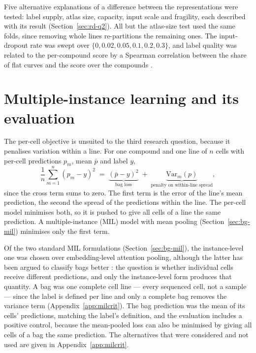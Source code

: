 Five alternative explanations of a difference between the representations were tested: label supply,
atlas size, capacity, input scale and fragility, each described with its result
(Section~\ref{sec:rd-q2}). All but the atlas-size test used the same folds, since removing whole lines
re-partitions the remaining ones. The input-dropout rate was swept over
$\{0, 0.02, 0.05, 0.1, 0.2, 0.3\}$, and label quality was related to the per-compound score by a
Spearman correlation between the share of flat curves and the score over the \NPanel{} compounds
\cite{bayer2023curvecurator}.

\section{Multiple-instance learning and its evaluation}
\label{sec:mil}

The per-cell objective is unsuited to the third research question, because it penalises variation
within a line. For one compound and one line of $n$ cells with per-cell predictions $p_m$, mean $\bar p$ and label $y$,
\begin{equation}
  \frac{1}{n}\sum_{m=1}^{n}\left(p_m - y\right)^2
  \;=\; \underbrace{\left(\bar{p} - y\right)^2}_{\text{bag loss}}
  \;+\; \underbrace{\mathrm{Var}_m(p)}_{\text{penalty on within-line spread}},
  \label{eq:mil-decomposition}
\end{equation}
since the cross term sums to zero. The first term is the error of the line's mean prediction, the second
the spread of the predictions within the line. The per-cell model minimises both, so it is pushed to
give all cells of a line the same prediction. A multiple-instance (MIL) model with mean pooling
(Section~\ref{sec:bg-mil}) minimises only the first term.

Of the two standard MIL formulations (Section~\ref{sec:bg-mil}), the instance-level one was chosen over
embedding-level attention pooling, although the latter has been argued to classify bags better \cite{ilse2018}: the
question is whether individual cells receive different predictions, and only
the instance-level form produces that quantity. A bag was one complete cell line --- every sequenced cell,
not a sample --- since the label is defined per line and only a complete bag removes the
variance term (Appendix~\ref{app:milcrit}). The bag prediction was the
mean of its cells' predictions, matching the label's definition, and the evaluation includes a
positive control, because the mean-pooled loss can also be minimised by giving all cells of a bag the
same prediction. The
alternatives that were considered and not used are given in Appendix~\ref{app:milcrit}.

